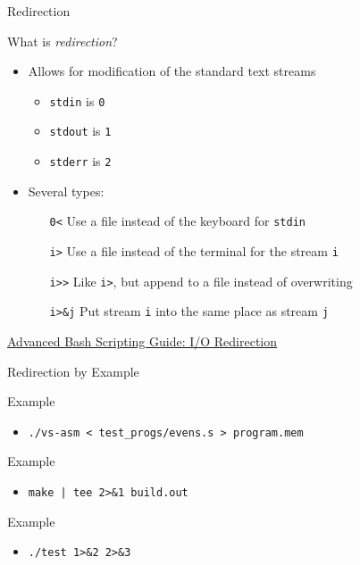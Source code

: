 \documentclass[table,dvipsnames]{beamer}
\begin{document}
\begin{frame}{Redirection}
	\begin{block}{What is \emph{redirection}?}
		\begin{itemize}
			\item Allows for modification of the standard text streams
				\begin{itemize}
					\item \texttt{stdin} is \texttt{0}
					\item \texttt{stdout} is \texttt{1}
					\item \texttt{stderr} is \texttt{2}
				\end{itemize}
			\item Several types:
				\begin{itemize}
					\item[\texttt{0<}] Use a file instead of the keyboard for
						\texttt{stdin}
					\item[\texttt{i>}] Use a file instead of the terminal for
						the stream \texttt{i}
					\item[\texttt{i>{}>}] Like \texttt{i>}, but append to a file 
						instead of overwriting
					\item[\texttt{i>\&j}] Put stream \texttt{i} into the same
						place as stream \texttt{j}
				\end{itemize}
		\end{itemize}
	\end{block}
	\href{http://www.tldp.org/LDP/abs/html/io-redirection.html}{Advanced Bash Scripting Guide: I/O Redirection}
\end{frame}

\begin{frame}{Redirection by Example}
	\begin{block}{Example}
		\begin{itemize}
			\item \texttt{./vs-asm < test\_progs/evens.s > program.mem}
		\end{itemize}
	\end{block}
	\begin{block}{Example}
		\begin{itemize}
			\item \texttt{make | tee 2>\&1 build.out}
		\end{itemize}
	\end{block}
	\begin{block}{Example}
		\begin{itemize}
			\item \texttt{./test 1>\&2 2>\&3}
		\end{itemize}
	\end{block}
\end{frame}
\end{document}
